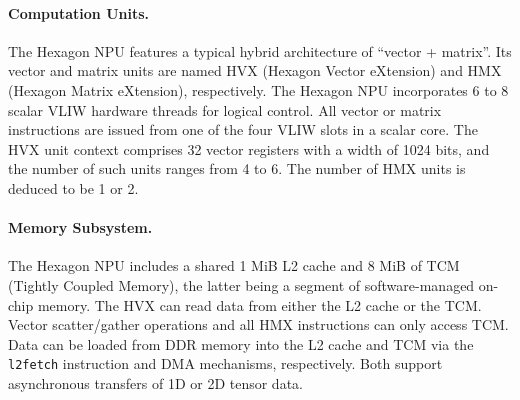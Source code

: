 \paragraph{Computation Units.} The Hexagon NPU features a typical hybrid architecture of “vector + matrix”. Its vector and matrix units are named HVX (Hexagon Vector eXtension) and HMX (Hexagon Matrix eXtension), respectively. The Hexagon NPU incorporates 6 to 8 scalar VLIW hardware threads for logical control. All vector or matrix instructions are issued from one of the four VLIW slots in a scalar core. The HVX unit context comprises 32 vector registers with a width of 1024 bits, and the number of such units ranges from 4 to 6. The number of HMX units is deduced to be 1 or 2.

\paragraph{Memory Subsystem.} The Hexagon NPU includes a shared 1 MiB L2 cache and 8 MiB of TCM (Tightly Coupled Memory), the latter being a segment of software-managed on-chip memory. The HVX can read data from either the L2 cache or the TCM. Vector scatter/gather operations and all HMX instructions can only access TCM. Data can be loaded from DDR memory into the L2 cache and TCM via the \texttt{l2fetch} instruction and DMA mechanisms, respectively. Both support asynchronous transfers of 1D or 2D tensor data.




